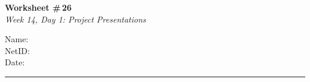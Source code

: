 \documentclass[11pt]{article}
\begin{document}
\noindent
\begin{minipage}[t]{0.55\textwidth}
  \vspace{0pt}
  {\LARGE \textbf{Worksheet \#\,26}} \\[0.3em]
  {\large \textit{Week 14, Day 1: Project Presentations}}
\end{minipage}
\hfill
\begin{minipage}[t]{0.40\textwidth}
  \vspace{0pt}
  \begin{mdframed}[linecolor=black, linewidth=1pt, innertopmargin=10pt, innerbottommargin=10pt]
    \small
    \vspace{0.4cm}
    Name: \underline{\hspace{4.5cm}} \\[1em]
    NetID: \underline{\hspace{4.3cm}} \\[1em]
    Date: \underline{\hspace{4.4cm}} \\
  \end{mdframed}
\end{minipage}

\vspace{1em}
\noindent\rule{\linewidth}{1pt}
\vspace{0.2em}
\end{document}
